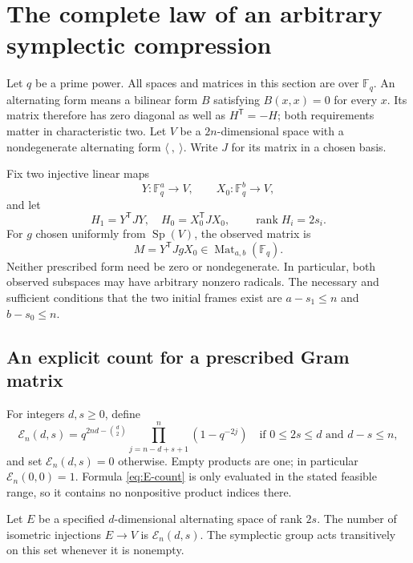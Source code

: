\section{The complete law of an arbitrary symplectic compression}
\label{sec:complete-law}

Let $q$ be a prime power. All spaces and matrices in this section are over
$\mathbb F_q$. An alternating form means a bilinear form $B$ satisfying
$B(x,x)=0$ for every $x$. Its matrix therefore has zero diagonal as well as
$H^{\mathsf T}=-H$; both requirements matter in characteristic two.
Let $V$ be a $2n$-dimensional space with a nondegenerate alternating form
$\langle\ ,\ \rangle$. Write $J$ for its matrix in a chosen basis.

Fix two injective linear maps
\[
 Y:\mathbb F_q^a\longrightarrow V,\qquad
 X_0:\mathbb F_q^b\longrightarrow V,
\]
and let
\[
 H_1=Y^{\mathsf T}JY,\quad H_0=X_0^{\mathsf T}JX_0,
 \qquad \operatorname{rank}H_i=2s_i.
\]
For $g$ chosen uniformly from $\operatorname{Sp}(V)$, the observed matrix is
\begin{equation}\label{eq:complete-observation}
 M=Y^{\mathsf T}JgX_0\in\operatorname{Mat}_{a,b}(\mathbb F_q).
\end{equation}
Neither prescribed form need be zero or nondegenerate. In particular, both
observed subspaces may have arbitrary nonzero radicals. The necessary and
sufficient conditions that the two initial frames exist are
$a-s_1\le n$ and $b-s_0\le n$.

\subsection{An explicit count for a prescribed Gram matrix}

For integers $d,s\ge0$, define
\begin{equation}\label{eq:E-count}
 \mathcal E_n(d,s)=
 q^{2nd-\binom d2}
 \prod_{j=n-d+s+1}^{n}(1-q^{-2j})
 \quad\text{if }0\le2s\le d\text{ and }d-s\le n,
\end{equation}
and set $\mathcal E_n(d,s)=0$ otherwise. Empty products are one; in
particular $\mathcal E_n(0,0)=1$. Formula \eqref{eq:E-count} is only
evaluated in the stated feasible range, so it contains no nonpositive
product indices there.

\begin{lemma}\label{lem:E-count}
Let $E$ be a specified $d$-dimensional alternating space of rank $2s$.
The number of isometric injections $E\longrightarrow V$ is
$\mathcal E_n(d,s)$. The symplectic group acts transitively on this set
whenever it is nonempty.
\end{lemma}

